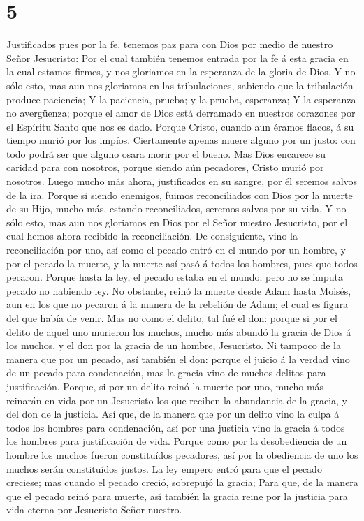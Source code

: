 \hypertarget{section-4}{%
\section{5}\label{section-4}}

 Justificados pues por la fe, tenemos paz para con Dios por
medio de nuestro Señor Jesucristo:  Por el cual también
tenemos entrada por la fe á esta gracia en la cual estamos firmes, y nos
gloriamos en la esperanza de la gloria de Dios.  Y no sólo
esto, mas aun nos gloriamos en las tribulaciones, sabiendo que la
tribulación produce paciencia;  Y la paciencia, prueba; y la
prueba, esperanza;  Y la esperanza no avergüenza; porque el
amor de Dios está derramado en nuestros corazones por el Espíritu Santo
que nos es dado.  Porque Cristo, cuando aun éramos flacos, á
su tiempo murió por los impíos.  Ciertamente apenas muere
alguno por un justo: con todo podrá ser que alguno osara morir por el
bueno.  Mas Dios encarece su caridad para con nosotros,
porque siendo aún pecadores, Cristo murió por nosotros. 
Luego mucho más ahora, justificados en su sangre, por él seremos salvos
de la ira.  Porque si siendo enemigos, fuimos reconciliados
con Dios por la muerte de su Hijo, mucho más, estando reconciliados,
seremos salvos por su vida.  Y no sólo esto, mas aun nos
gloriamos en Dios por el Señor nuestro Jesucristo, por el cual hemos
ahora recibido la reconciliación.  De consiguiente, vino la
reconciliación por uno, así como el pecado entró en el mundo por un
hombre, y por el pecado la muerte, y la muerte así pasó á todos los
hombres, pues que todos pecaron.  Porque hasta la ley, el
pecado estaba en el mundo; pero no se imputa pecado no habiendo ley.
 No obstante, reinó la muerte desde Adam hasta Moisés, aun
en los que no pecaron á la manera de la rebelión de Adam; el cual es
figura del que había de venir.  Mas no como el delito, tal
fué el don: porque si por el delito de aquel uno murieron los muchos,
mucho más abundó la gracia de Dios á los muchos, y el don por la gracia
de un hombre, Jesucristo.  Ni tampoco de la manera que por
un pecado, así también el don: porque el juicio á la verdad vino de un
pecado para condenación, mas la gracia vino de muchos delitos para
justificación.  Porque, si por un delito reinó la muerte
por uno, mucho más reinarán en vida por un Jesucristo los que reciben la
abundancia de la gracia, y del don de la justicia.  Así
que, de la manera que por un delito vino la culpa á todos los hombres
para condenación, así por una justicia vino la gracia á todos los
hombres para justificación de vida.  Porque como por la
desobediencia de un hombre los muchos fueron constituídos pecadores, así
por la obediencia de uno los muchos serán constituídos justos.
 La ley empero entró para que el pecado creciese; mas
cuando el pecado creció, sobrepujó la gracia;  Para que, de
la manera que el pecado reinó para muerte, así también la gracia reine
por la justicia para vida eterna por Jesucristo Señor nuestro.

